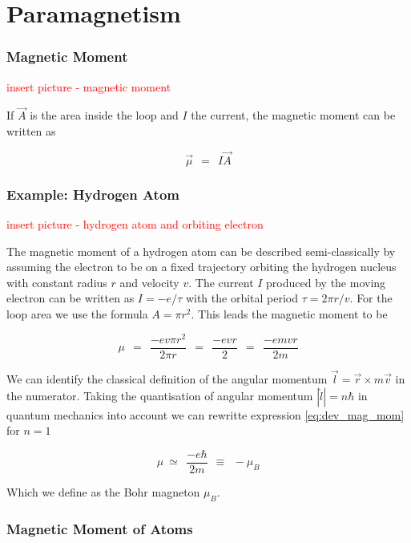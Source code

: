 \documentclass[10pt]{report}
\numberwithin{equation}{chapter}
\begin{document}
\section{Paramagnetism}

\subsubsection{Magnetic Moment}

\textcolor{red}{insert picture - magnetic moment}

If $\vec{A}$ is the area inside the loop and $I$ the current, the magnetic moment can be written as

\begin{equation} \label{eq:mag_mom}
  \vec{\mu} ~~=~~ I \vec{A}
\end{equation}


\subsubsection{Example: Hydrogen Atom}

\textcolor{red}{insert picture - hydrogen atom and orbiting electron}

The magnetic moment of a hydrogen atom can be described semi-classically by assuming the electron to be on a fixed trajectory orbiting the hydrogen nucleus with constant radius $r$ and velocity $v$. The current $I$ produced by the moving electron can be written as $I = -e/\tau$ with the orbital period $\tau = 2\pi r/v$. For the loop area we use the formula $A= \pi r^2$. This leads the magnetic moment to be

\begin{equation} \label{eq:dev_mag_mom}
  \mu ~~=~~ \frac{-e v \pi r^2}{2 \pi r} ~~=~~ \frac{-evr}{2} ~~=~~ \frac{-e m v r}{2m}
\end{equation}

We can identify the classical definition of the angular momentum  $\vec{l} = \vec{r} \times m \vec{v}$ in the numerator. Taking the quantisation of angular momentum $|\hat{l}| = n \hbar$ in quantum mechanics into account we can rewritte expression \ref{eq:dev_mag_mom} for $n=1$

\begin{equation} \label{eq:bohr_mag}
  \mu ~≃ ~~ \frac{-e \hbar}{2m} ~~ \equiv ~~ -\mu_B
\end{equation}

Which we define as the Bohr magneton $\mu_B$.


\subsubsection{Magnetic Moment of Atoms}
\end{document}
